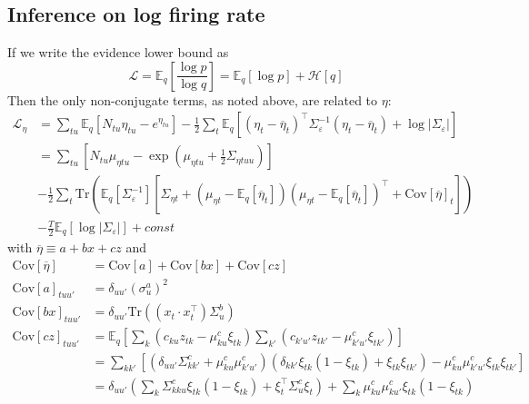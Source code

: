 \documentclass[11pt]{article}
\begin{document}
\subsection{Inference on log firing rate}
If we write the evidence lower bound as
\begin{equation}
    \mathcal{L} = \mathbb{E}_q \left[ \frac{\log p}{\log q}\right] =
    \mathbb{E}_q[\log p] + \mathcal{H}[q]
\end{equation}
Then the only non-conjugate terms, as noted above, are related to $\eta$:
\begin{align}
    \mathcal{L}_\eta &=
    \sum_{tu} \mathbb{E}_q[N_{tu} \eta_{tu} - e^{\eta_{tu}}]
    - \frac{1}{2} \sum_{t} \mathbb{E}_q \left[
    (\eta_t - \overline{\eta}_t)^\top \Sigma_\varepsilon^{-1}(\eta_t - \overline{\eta}_t)
    + \log |\Sigma_\varepsilon| \right]\\
    &= \sum_{tu} \left[ N_{tu} \mu_{\eta tu} -
    \exp\left(\mu_{\eta tu} + \frac{1}{2} \Sigma_{\eta tuu} \right)\right] \\
    \label{eta_cov}
    &- \frac{1}{2} \sum_{t} \mathrm{Tr}\left(
    \mathbb{E}_q[\Sigma_\varepsilon^{-1}]
    \left[ \Sigma_{\eta t} + (\mu_{\eta t} - \mathbb{E}_q[\overline{\eta}_{t}])
    (\mu_{\eta t} - \mathbb{E}_q[\overline{\eta}_{t}])^\top
    + \mathrm{Cov}[\overline{\eta}]_{t}\right] \right) \\
    &- \frac{T}{2} \mathbb{E}_q[\log |\Sigma_\varepsilon|] + const
\end{align}
with $\overline{\eta} \equiv a + bx + cz$ and
\begin{align}
    \mathrm{Cov}[\overline{\eta}] &= \mathrm{Cov}[a] + \mathrm{Cov}[bx] + \mathrm{Cov}[cz] \\
    \mathrm{Cov}[a]_{tuu'} &= \delta_{uu'}(\sigma^a_u)^2 \\
    \mathrm{Cov}[bx]_{tuu'} &= \delta_{uu'}\mathrm{Tr}\left((x_t\cdot x_t^\top) \Sigma^b_{u}\right) \\
    \mathrm{Cov}[cz]_{tuu'} &= \mathbb{E}_q\left[\sum_{k}\left( c_{ku} z_{tk} - \mu^c_{ku}\xi_{tk} \right)\sum_{k'}\left( c_{k'u'} z_{tk'} - \mu^c_{k'u'}\xi_{tk'} \right)\right] \\
    &= \sum_{kk'}\left[\left(\delta_{uu'}\Sigma^c_{kk'} + \mu^c_{ku} \mu^c_{k'u'} \right)\left(\delta_{kk'}\xi_{tk}(1 - \xi_{tk}) + \xi_{tk}\xi_{tk'}\right) - \mu^c_{ku}\mu^c_{k'u'}\xi_{tk}\xi_{tk'} \right] \\
    &= \delta_{uu'}\left(\sum_k \Sigma^c_{kku} \xi_{tk} (1 - \xi_{tk}) + \xi_t^\top \Sigma_u^c \xi_t\right) + \sum_k \mu^c_{ku}\mu^c_{ku'}\xi_{tk}(1 - \xi_{tk})
\end{align}
\end{document}

